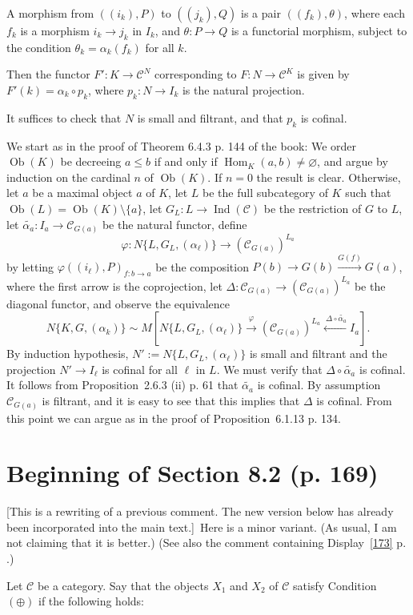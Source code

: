 \documentclass[12pt]{article}
\newcommand{\C}{\mathcal C}
\newcommand{\p}{\varphi}
\newcommand{\xr}{\xrightarrow}
\newcommand{\ccd}{the comment containing Display}
\newcommand{\pr}{Proposition}
\newcommand{\rw}{[This is a rewriting of a previous comment. The new version below has already been incorporated into the main text.]}
\DeclareMathOperator{\h}{Hom}
\DeclareMathOperator{\Ind}{Ind}
\DeclareMathOperator{\Ob}{Ob}
\begin{document}
A morphism from $((i_k),P)$ to $((j_k),Q)$ is a pair $((f_k),\theta)$, where each $f_k$ is a morphism $i_k\to j_k$ in $I_k$, and $\theta:P\to Q$ is a functorial morphism, subject to the condition $\theta_k=\alpha_k(f_k)$ for all $k$. 

Then the functor $F':K\to\C^N$ corresponding to $F:N\to\C^K$ is given by $F'(k)=\alpha_k\circ p_k$, where $p_k:N\to I_k$ is the natural projection. 

It suffices to check that $N$ is small and filtrant, and that $p_k$ is cofinal. 

We start as in the proof of Theorem 6.4.3 p. 144 of the book:  We order $\Ob(K)$ be decreeing $a\le b$ if and only if $\h_K(a,b)\neq\varnothing$, and argue by induction on the cardinal $n$ of $\Ob(K)$. If $n=0$ the result is clear. Otherwise, let $a$ be a maximal object $a$ of $K$, let $L$ be the full subcategory of $K$ such that $\Ob(L)=\Ob(K)\setminus\{a\}$, let $G_L:L\to\Ind(\C)$ be the restriction of $G$ to $L$, let $\widetilde{\alpha_a}:I_a\to\C_{G(a)}$ be the natural functor, define  
$$ 
\p:N\{L,G_L,(\alpha_\ell)\}\to(\C_{G(a)})^{L_a} 
$$ 
by letting $\p((i_\ell),P)_{f:b\to a}$ be the composition $P(b)\to G(b)\xr{G(f)}G(a)$, where the first arrow is the coprojection, let $\Delta:\C_{G(a)}\to(\C_{G(a)})^{L_a}$ be the diagonal functor, and observe the equivalence 
$$ 
N\{K,G,(\alpha_k)\}\sim M\left[N\{L,G_L,(\alpha_\ell)\}\xrightarrow{\p}(\C_{G(a)})^{L_a}\xleftarrow{\ \Delta\circ\widetilde{\alpha_a}}I_a\right]. 
$$ 
By induction hypothesis, $N':=N\{L,G_L,(\alpha_\ell)\}$ is small and filtrant and the projection $N'\to I_\ell$ is cofinal for all $\ell$ in $L$. We must verify that $\Delta\circ\widetilde{\alpha_a}$ is cofinal. It follows from \pr\ 2.6.3 (ii) p. 61 that $\widetilde{\alpha_a}$ is cofinal. By assumption $\C_{G(a)}$ is filtrant, and it is easy to see that this implies that $\Delta$ is cofinal. From this point we can argue as in the proof of \pr\ 6.1.13 p. 134. 


% 
\section{Beginning of Section 8.2 (p. 169)} \label{169}
% 
\rw\ Here is a minor variant. (As usual, I am not claiming that it is better.) (See also \ccd\ \eqref{173} p. \pageref{173}.) 

Let $\C$ be a category. Say that the objects $X_1$ and $X_2$ of $\C$ satisfy Condition~$(\oplus)$ if the following holds: 
\end{document}
